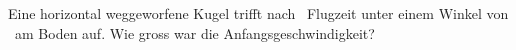 Eine horizontal weggeworfene Kugel trifft nach \tflO\ Flugzeit unter einem Winkel von \alO\ am Boden auf. Wie gross war die Anfangsgeschwindigkeit?
